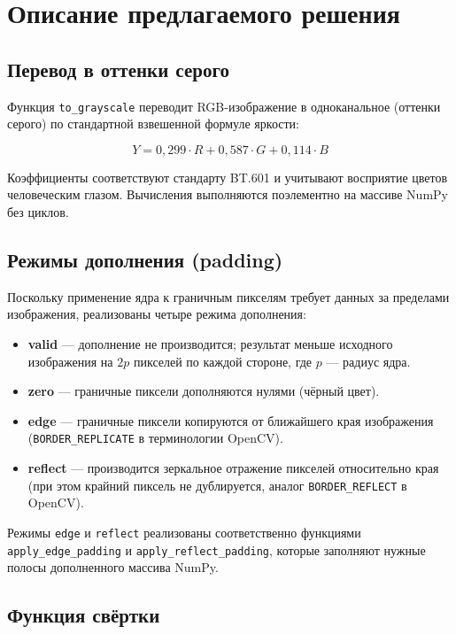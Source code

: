 \documentclass[a4paper]{article}
\begin{document}
\section{Описание предлагаемого решения}

\subsection{Перевод в оттенки серого}

Функция \verb|to_grayscale| переводит RGB-изображение в одноканальное (оттенки серого) по стандартной взвешенной формуле яркости:

\[
Y = 0{,}299 \cdot R + 0{,}587 \cdot G + 0{,}114 \cdot B
\]

Коэффициенты соответствуют стандарту BT.601 и учитывают восприятие цветов человеческим глазом. Вычисления выполняются поэлементно на массиве NumPy без циклов.

\subsection{Режимы дополнения (padding)}

Поскольку применение ядра к граничным пикселям требует данных за пределами изображения, реализованы четыре режима дополнения:

\begin{itemize}[leftmargin=3.5em, topsep=0pt]
    \item \textbf{valid} --- дополнение не производится; результат меньше исходного изображения на \(2p\) пикселей по каждой стороне, где \(p\) --- радиус ядра.
    \item \textbf{zero} --- граничные пиксели дополняются нулями (чёрный цвет).
    \item \textbf{edge} --- граничные пиксели копируются от ближайшего края изображения (\verb|BORDER_REPLICATE| в терминологии OpenCV).
    \item \textbf{reflect} --- производится зеркальное отражение пикселей относительно края (при этом крайний пиксель не дублируется, аналог \verb|BORDER_REFLECT| в OpenCV).
\end{itemize}

Режимы \verb|edge| и \verb|reflect| реализованы соответственно функциями \verb|apply_edge_padding| и \verb|apply_reflect_padding|, которые заполняют нужные полосы дополненного массива NumPy.

\subsection{Функция свёртки}
\end{document}
